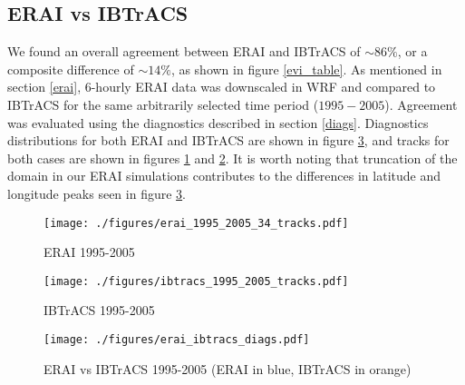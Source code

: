 \subsection{ERAI vs IBTrACS}
We found an overall agreement between ERAI and IBTrACS of $\sim86\%$, or a composite difference of $\sim14\%$, as shown in figure \ref{evi_table}. As mentioned in section \ref{erai}, $6$-hourly ERAI data was downscaled in WRF and compared to IBTrACS for the same arbitrarily selected time period ($1995-2005$). Agreement was evaluated using the diagnostics described in section \ref{diags}. Diagnostics distributions for both ERAI and IBTrACS are shown in figure \ref{evi_diags}, and tracks for both cases are shown in figures \ref{erai_tracks} and \ref{ibtracs_tracks}. It is worth noting that truncation of the domain in our ERAI simulations contributes to the differences in latitude and longitude peaks seen in figure \ref{evi_diags}.  


\begin{figure}[!tbp]
\centering
\texttt{[image: ./figures/erai\_1995\_2005\_34\_tracks.pdf]}
\caption{ERAI 1995-2005}
\label{erai_tracks}
\end{figure}

\begin{figure}[!tbp]
\centering
\texttt{[image: ./figures/ibtracs\_1995\_2005\_tracks.pdf]}
\caption{IBTrACS 1995-2005}
\label{ibtracs_tracks}
\end{figure}

\begin{figure}[!tbp]
\centering
\texttt{[image: ./figures/erai\_ibtracs\_diags.pdf]}
\caption{ERAI vs IBTrACS 1995-2005 (ERAI in blue, IBTrACS in orange)}
\label{evi_diags}
\end{figure}


